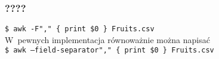 \documentclass[10pt,t]{beamer}
\begin{document}








\begin{frame}
  \frametitle{????}


  \texttt{\$ awk -F"," \{ print \$0 \} Fruits.csv} \\
  W~pewnych implementacja równoważnie można napisać \\
  \texttt{\$ awk --field-separator"," \{ print \$0 \} Fruits.csv}

\end{frame}













\end{document}
